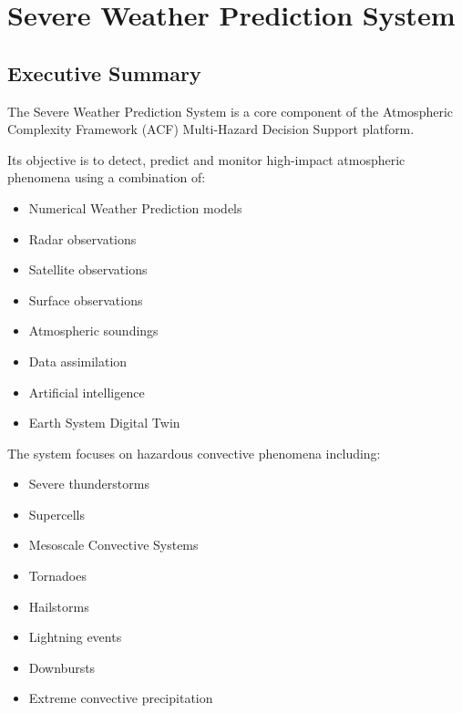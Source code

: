 
\section{Severe Weather Prediction System}

\subsection{Executive Summary}

The Severe Weather Prediction System is a core component of the
Atmospheric Complexity Framework (ACF) Multi-Hazard Decision Support
platform.

Its objective is to detect, predict and monitor high-impact atmospheric
phenomena using a combination of:

\begin{itemize}

\item Numerical Weather Prediction models

\item Radar observations

\item Satellite observations

\item Surface observations

\item Atmospheric soundings

\item Data assimilation

\item Artificial intelligence

\item Earth System Digital Twin

\end{itemize}

The system focuses on hazardous convective phenomena including:

\begin{itemize}

\item Severe thunderstorms

\item Supercells

\item Mesoscale Convective Systems

\item Tornadoes

\item Hailstorms

\item Lightning events

\item Downbursts

\item Extreme convective precipitation

\end{itemize}

